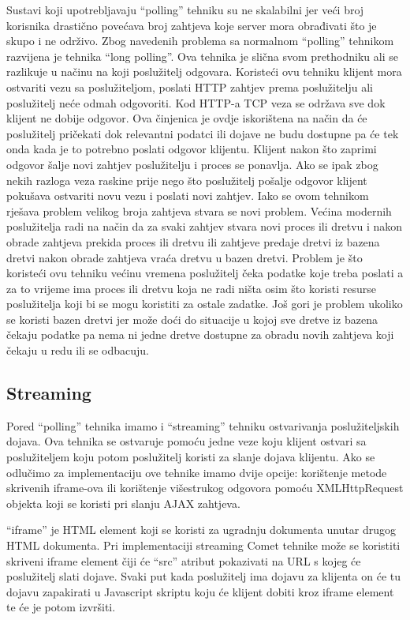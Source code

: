 \documentclass[times, utf8, zavrsni]{fer}
\begin{document}
Sustavi koji upotrebljavaju ``polling'' tehniku su ne skalabilni jer veći broj korisnika drastično povećava broj zahtjeva koje server mora obrađivati što je skupo i ne održivo. Zbog navedenih problema sa normalnom ``polling'' tehnikom razvijena je tehnika ``long polling''. Ova tehnika je slična svom prethodniku ali se razlikuje u načinu na koji poslužitelj odgovara. Koristeći ovu tehniku klijent mora ostvariti vezu sa poslužiteljom, poslati HTTP zahtjev prema poslužitelju ali poslužitelj neće odmah odgovoriti. Kod HTTP-a TCP veza se održava sve dok klijent ne dobije odgovor. Ova činjenica je ovdje iskorištena na način da će poslužitelj pričekati dok relevantni podatci ili dojave ne budu dostupne pa će tek onda kada je to potrebno poslati odgovor klijentu. Klijent nakon što zaprimi odgovor šalje novi zahtjev poslužitelju i proces se ponavlja. Ako se ipak zbog nekih razloga veza raskine prije nego što poslužitelj pošalje odgovor klijent pokušava ostvariti novu vezu i poslati novi zahtjev. Iako se ovom tehnikom rješava problem velikog broja zahtjeva stvara se novi problem. Većina modernih poslužitelja radi na način da za svaki zahtjev stvara novi proces ili dretvu i nakon obrade zahtjeva prekida proces ili dretvu ili zahtjeve predaje dretvi iz bazena dretvi nakon obrade zahtjeva  vraća dretvu u bazen dretvi. Problem je što koristeći ovu tehniku većinu vremena poslužitelj čeka podatke koje treba poslati a za to vrijeme ima proces ili dretvu koja ne radi ništa osim što koristi resurse poslužitelja koji bi se mogu koristiti za ostale zadatke. Još gori je problem ukoliko se koristi bazen dretvi jer može doći do situacije u kojoj sve dretve iz bazena čekaju podatke pa nema ni jedne dretve dostupne za obradu novih zahtjeva koji čekaju u redu ili se odbacuju.

\subsection{Streaming}
Pored ``polling'' tehnika imamo i ``streaming'' tehniku ostvarivanja poslužiteljskih dojava. Ova tehnika se ostvaruje pomoću jedne veze koju klijent ostvari sa poslužiteljem koju potom poslužitelj koristi za slanje dojava klijentu. Ako se odlučimo za implementaciju ove tehnike imamo dvije opcije: korištenje metode skrivenih iframe-ova ili korištenje višestrukog odgovora pomoću XMLHttpRequest objekta koji se koristi pri slanju AJAX zahtjeva.

``iframe'' je HTML element koji se koristi za ugradnju dokumenta unutar drugog HTML dokumenta. Pri implementaciji streaming Comet tehnike može se koristiti skriveni iframe element čiji će ``src'' atribut pokazivati na URL s kojeg će poslužitelj slati dojave. Svaki put kada poslužitelj ima dojavu za klijenta on će tu dojavu zapakirati u Javascript skriptu koju će klijent dobiti kroz iframe element te će je potom izvršiti.
\end{document}
